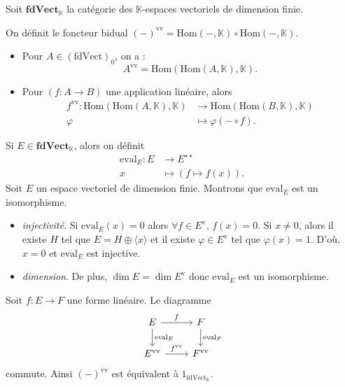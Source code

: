 \begin{exm}[bidualité]
  Soit $\mathbf{fdVect}_\mathds{K}$ la catégorie des $\mathds{K}$-espaces vectoriels de dimension finie.

  On définit le foncteur bidual $(-)^{\mathrm{vv}} = \mathrm{Hom}(-, \mathds{K}) \circ \mathrm{Hom}(-, \mathds{K})$.
  \begin{itemize}
    \item Pour $A \in (\mathrm{fdVect})_0$, on a :
      \[
      A^\mathrm{vv} = \mathrm{Hom}(\mathrm{Hom}(A, \mathds{K}), \mathds{K})
      .\]
    \item Pour $(f : A \to B)$ une application linéaire, alors
      \begin{align*}
        f^\mathrm{vv}: \mathrm{Hom}(\mathrm{Hom}(A, \mathds{K}), \mathds{K}) &\longrightarrow  \mathrm{Hom}(\mathrm{Hom}(B, \mathds{K}), \mathds{K}) \\
        \varphi &\longmapsto \varphi(- \circ f)
      .\end{align*}
  \end{itemize}

  Si $E \in \mathbf{fdVect}_\mathds{K}$, alors on définit 
  \begin{align*}
    \mathrm{eval}_E: E &\longrightarrow E^{\star\star} \\
    x &\longmapsto (f \mapsto f(x))
  .\end{align*}
  Soit $E$ un espace vectoriel de dimension finie.
  Montrons que $\mathrm{eval}_E$ est un isomorphisme.
  \begin{itemize}
    \item \textit{injectivité}.
      Si $\mathrm{eval}_E(x) = 0$ alors $\forall f \in E^\mathrm{v}$, $f(x) = 0$.
      Si $x \neq 0$, alors il existe $H$ tel que $E = H \oplus \langle x \rangle$
      et il existe $\varphi \in E^\mathrm{v}$ tel que $\varphi(x) = 1$.
      D'où, $x = 0$ et $\mathrm{eval}_E$ est injective.
    \item \textit{dimension}. De plus, $\dim E = \dim E^\mathrm{v}$ donc $\mathrm{eval}_E$ est un isomorphisme.
  \end{itemize}

  Soit $f : E \to F$ une forme linéaire.
  Le diagramme 
  \[
  \begin{tikzcd}
    E \arrow{r}{f}\arrow{d}{\mathrm{eval}_E} & F \arrow{d}{\mathrm{eval}_F}\\
    E^\mathrm{vv} \arrow{r}{f^\mathrm{vv}} & F^\mathrm{vv}
  \end{tikzcd}
  \] commute.
  Ainsi $(-)^\mathrm{vv}$ est équivalent à $1_{\mathrm{fdVect}_{\mathds{K}}}$.
\end{exm}

